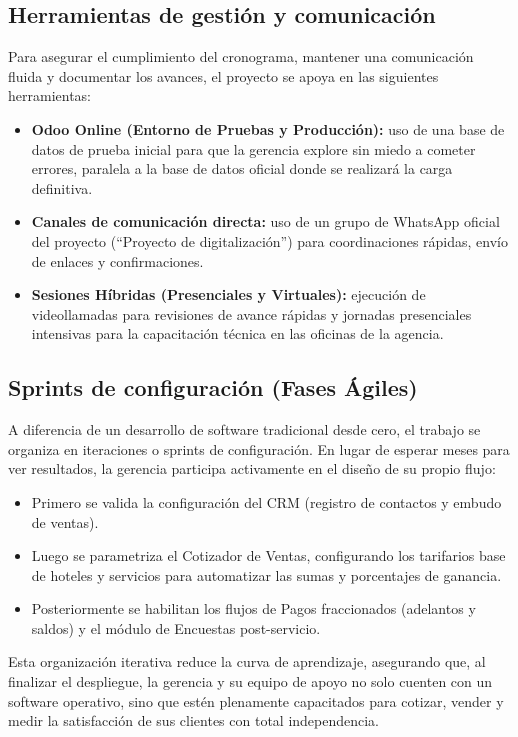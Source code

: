 \subsection{Herramientas de gestión y comunicación}
\begin{indentedsubsection}
Para asegurar el cumplimiento del cronograma, mantener una comunicación fluida y documentar los avances, el proyecto se apoya en las siguientes herramientas:

\begin{itemize}
    \item \textbf{Odoo Online (Entorno de Pruebas y Producción):} uso de una base de datos de prueba inicial para que la gerencia explore sin miedo a cometer errores, paralela a la base de datos oficial donde se realizará la carga definitiva.
    \item \textbf{Canales de comunicación directa:} uso de un grupo de WhatsApp oficial del proyecto (``Proyecto de digitalización'') para coordinaciones rápidas, envío de enlaces y confirmaciones.
    \item \textbf{Sesiones Híbridas (Presenciales y Virtuales):} ejecución de videollamadas para revisiones de avance rápidas y jornadas presenciales intensivas para la capacitación técnica en las oficinas de la agencia.
\end{itemize}
\end{indentedsubsection}

\subsection{Sprints de configuración (Fases Ágiles)}
\begin{indentedsubsection}
A diferencia de un desarrollo de software tradicional desde cero, el trabajo se organiza en iteraciones o sprints de configuración. En lugar de esperar meses para ver resultados, la gerencia participa activamente en el diseño de su propio flujo:

\begin{itemize}
    \item Primero se valida la configuración del CRM (registro de contactos y embudo de ventas).
    \item Luego se parametriza el Cotizador de Ventas, configurando los tarifarios base de hoteles y servicios para automatizar las sumas y porcentajes de ganancia.
    \item Posteriormente se habilitan los flujos de Pagos fraccionados (adelantos y saldos) y el módulo de Encuestas post-servicio.
\end{itemize}

Esta organización iterativa reduce la curva de aprendizaje, asegurando que, al finalizar el despliegue, la gerencia y su equipo de apoyo no solo cuenten con un software operativo, sino que estén plenamente capacitados para cotizar, vender y medir la satisfacción de sus clientes con total independencia.
\end{indentedsubsection}
